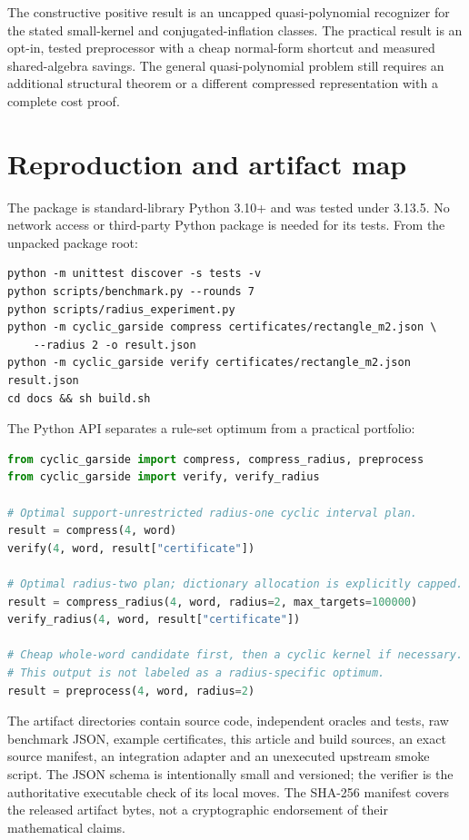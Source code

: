 \documentclass[11pt,a4paper]{article}
\theoremstyle{definition}\newtheorem{definition}[theorem]{Definition}
\theoremstyle{remark}\newtheorem{remark}[theorem]{Remark}
\begin{document}
The constructive positive result is an uncapped quasi-polynomial
recognizer for the stated small-kernel and conjugated-inflation classes.
The practical result is an opt-in, tested preprocessor with a cheap
normal-form shortcut and measured shared-algebra savings. The general
quasi-polynomial problem still requires an additional structural theorem
or a different compressed representation with a complete cost proof.

\appendix
\section{Reproduction and artifact map}
The package is standard-library Python 3.10+ and was tested under 3.13.5.
No network access or third-party Python package is needed for its tests.
From the unpacked package root:
\begin{lstlisting}
python -m unittest discover -s tests -v
python scripts/benchmark.py --rounds 7
python scripts/radius_experiment.py
python -m cyclic_garside compress certificates/rectangle_m2.json \
    --radius 2 -o result.json
python -m cyclic_garside verify certificates/rectangle_m2.json result.json
cd docs && sh build.sh
\end{lstlisting}
The Python API separates a rule-set optimum from a practical portfolio:
\begin{lstlisting}[language=Python]
from cyclic_garside import compress, compress_radius, preprocess
from cyclic_garside import verify, verify_radius

# Optimal support-unrestricted radius-one cyclic interval plan.
result = compress(4, word)
verify(4, word, result["certificate"])

# Optimal radius-two plan; dictionary allocation is explicitly capped.
result = compress_radius(4, word, radius=2, max_targets=100000)
verify_radius(4, word, result["certificate"])

# Cheap whole-word candidate first, then a cyclic kernel if necessary.
# This output is not labeled as a radius-specific optimum.
result = preprocess(4, word, radius=2)
\end{lstlisting}

The artifact directories contain source code, independent oracles and tests,
raw benchmark JSON, example certificates, this article and build sources,
an exact source manifest, an integration adapter and an unexecuted upstream
smoke script. The JSON schema is intentionally small and versioned; the
verifier is the authoritative executable check of its local moves.
The SHA-256 manifest covers the released artifact bytes, not a cryptographic
endorsement of their mathematical claims.
\end{document}
